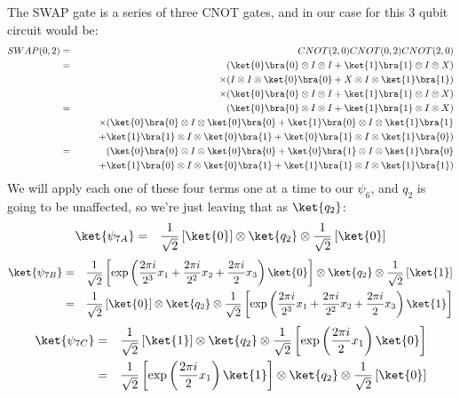 \documentclass[preprint,aps,prd,nofootinbib,superscriptaddress]{revtex4-2}
\newcommand{\KetBra}[2]{\ket{#1}\bra{#2}}
\begin{document}
%
The SWAP gate is a series of three CNOT gates, and in our case for this 3 qubit circuit would be:
%
\begin{eqnarray} 
SWAP(0,2) &=& CNOT(2,0) CNOT(0,2) CNOT(2,0)
\nonumber \\
&=& (\KetBra{0}{0} \otimes I \otimes  I + \KetBra{1}{1} \otimes I \otimes X) 
\nonumber \\
&& \quad \times 
(I \otimes I \otimes \KetBra{0}{0} + X \otimes I \otimes \KetBra{1}{1}) 
\nonumber \\
&& \quad \times 
(\KetBra{0}{0} \otimes I \otimes I + \KetBra{1}{1} \otimes I \otimes X)
\nonumber \\
&=& (\KetBra{0}{0} \otimes I \otimes  I + \KetBra{1}{1} \otimes I \otimes X) 
\nonumber \\
&& \quad \times 
(\KetBra{0}{0} \otimes I \otimes \KetBra{0}{0} + \KetBra{1}{0} \otimes I \otimes \KetBra{1}{1} 
\nonumber \\
&& \quad \quad + \KetBra{1}{1} \otimes I \otimes \KetBra{0}{1} + \KetBra{0}{1} \otimes I \otimes \KetBra{1}{0}) 
\nonumber \\
&=&
(\KetBra{0}{0} \otimes I \otimes \KetBra{0}{0} + \KetBra{0}{1} \otimes I \otimes \KetBra{1}{0}
\nonumber \\
&& \quad \quad +  \KetBra{1}{0} \otimes I \otimes \KetBra{0}{1} + \KetBra{1}{1} \otimes I \otimes \KetBra{1}{1} ) 
\end{eqnarray}
%
We will apply each one of these four terms one at a time to our $\psi_6$, and $q_2$ is going to be unaffected, so we're just leaving that as $\ket{q_2}$:
%
\begin{eqnarray} 
\ket{\psi_{7A}} &=& \frac{1}{\sqrt{2}} \left[\ket{0} \right] 
\otimes \ket{q_2}
\otimes \frac{1}{\sqrt{2}} \left[\ket{0}\right]
\nonumber
\end{eqnarray}
%
\begin{eqnarray} 
\ket{\psi_{7B}} &=& \frac{1}{\sqrt{2}} \left[\exp\left(\frac{2\pi i}{2^3} x_1 + \frac{2\pi i}{2^2} x_2 + \frac{2\pi i}{2} x_3 \right)\ket{0} \right] 
\otimes \ket{q_2}
\otimes \frac{1}{\sqrt{2}} \left[\ket{1}\right]
\nonumber \\
&=& \frac{1}{\sqrt{2}} \left[\ket{0} \right] 
\otimes \ket{q_2}
\otimes \frac{1}{\sqrt{2}} \left[\exp\left(\frac{2\pi i}{2^3} x_1 + \frac{2\pi i}{2^2} x_2 + \frac{2\pi i}{2} x_3 \right)\ket{1}\right]
\end{eqnarray}
%
\begin{eqnarray} 
\ket{\psi_{7C}} &=& \frac{1}{\sqrt{2}} \left[\ket{1} \right] 
\otimes \ket{q_2}
\otimes \frac{1}{\sqrt{2}} \left[ \exp\left(\frac{2\pi i}{2} x_1 \right)\ket{0} \right]
\nonumber \\
&=& \frac{1}{\sqrt{2}} \left[\exp\left(\frac{2\pi i}{2} x_1 \right)\ket{1} \right] 
\otimes \ket{q_2}
\otimes \frac{1}{\sqrt{2}} \left[ \ket{0} \right]
\end{eqnarray}
\end{document}
